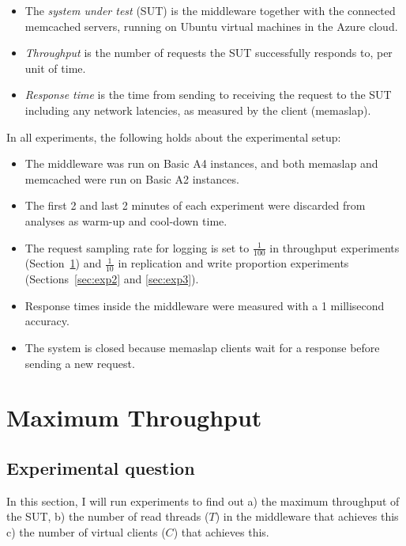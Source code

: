 \documentclass[11pt]{article}
\begin{document}
\begin{itemize}
\item The \emph{system under test} (SUT) is the middleware together with the connected memcached servers, running on Ubuntu virtual machines in the Azure cloud.
\item \emph{Throughput} is the number of requests the SUT successfully responds to, per unit of time.
\item \emph{Response time} is the time from sending to receiving the request to the SUT including any network latencies, as measured by the client (memaslap).
\end{itemize}

In all experiments, the following holds about the experimental setup:
\begin{itemize}
\item The middleware was run on Basic A4 instances, and both memaslap and memcached were run on Basic A2 instances.
\item The first 2 and last 2 minutes of each experiment were discarded from analyses as warm-up and cool-down time.
\item The request sampling rate for logging is set to $\frac{1}{100}$ in throughput experiments (Section~\ref{sec:exp1}) and $\frac{1}{10}$ in replication and write proportion experiments (Sections~\ref{sec:exp2} and \ref{sec:exp3}).
\item Response times inside the middleware were measured with a 1 millisecond accuracy.
\item The system is closed because memaslap clients wait for a response before sending a new request.
\end{itemize}


\clearpage
\section{Maximum Throughput}
\label{sec:exp1}

\subsection{Experimental question}

In this section, I will run experiments to find out a) the maximum throughput of the SUT, b) the number of read threads ($T$) in the middleware that achieves this c) the number of virtual clients ($C$) that achieves this.
\end{document}
